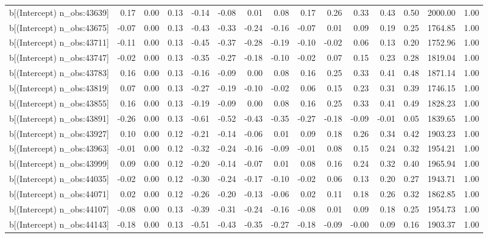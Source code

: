 \begin{table}[ht]
\begin{tabular}{rrrrrrrrrrrrrrr}
  b[(Intercept) n\_obs:43639] & 0.17 & 0.00 & 0.13 & -0.14 & -0.08 & 0.01 & 0.08 & 0.17 & 0.26 & 0.33 & 0.43 & 0.50 & 2000.00 & 1.00 \\ 
  b[(Intercept) n\_obs:43675] & -0.07 & 0.00 & 0.13 & -0.43 & -0.33 & -0.24 & -0.16 & -0.07 & 0.01 & 0.09 & 0.19 & 0.25 & 1764.85 & 1.00 \\ 
  b[(Intercept) n\_obs:43711] & -0.11 & 0.00 & 0.13 & -0.45 & -0.37 & -0.28 & -0.19 & -0.10 & -0.02 & 0.06 & 0.13 & 0.20 & 1752.96 & 1.00 \\ 
  b[(Intercept) n\_obs:43747] & -0.02 & 0.00 & 0.13 & -0.35 & -0.27 & -0.18 & -0.10 & -0.02 & 0.07 & 0.15 & 0.23 & 0.28 & 1819.04 & 1.00 \\ 
  b[(Intercept) n\_obs:43783] & 0.16 & 0.00 & 0.13 & -0.16 & -0.09 & 0.00 & 0.08 & 0.16 & 0.25 & 0.33 & 0.41 & 0.48 & 1871.14 & 1.00 \\ 
  b[(Intercept) n\_obs:43819] & 0.07 & 0.00 & 0.13 & -0.27 & -0.19 & -0.10 & -0.02 & 0.06 & 0.15 & 0.23 & 0.31 & 0.39 & 1746.15 & 1.00 \\ 
  b[(Intercept) n\_obs:43855] & 0.16 & 0.00 & 0.13 & -0.19 & -0.09 & 0.00 & 0.08 & 0.16 & 0.25 & 0.33 & 0.41 & 0.49 & 1828.23 & 1.00 \\ 
  b[(Intercept) n\_obs:43891] & -0.26 & 0.00 & 0.13 & -0.61 & -0.52 & -0.43 & -0.35 & -0.27 & -0.18 & -0.09 & -0.01 & 0.05 & 1839.65 & 1.00 \\ 
  b[(Intercept) n\_obs:43927] & 0.10 & 0.00 & 0.12 & -0.21 & -0.14 & -0.06 & 0.01 & 0.09 & 0.18 & 0.26 & 0.34 & 0.42 & 1903.23 & 1.00 \\ 
  b[(Intercept) n\_obs:43963] & -0.01 & 0.00 & 0.12 & -0.32 & -0.24 & -0.16 & -0.09 & -0.01 & 0.08 & 0.15 & 0.24 & 0.32 & 1954.21 & 1.00 \\ 
  b[(Intercept) n\_obs:43999] & 0.09 & 0.00 & 0.12 & -0.20 & -0.14 & -0.07 & 0.01 & 0.08 & 0.16 & 0.24 & 0.32 & 0.40 & 1965.94 & 1.00 \\ 
  b[(Intercept) n\_obs:44035] & -0.02 & 0.00 & 0.12 & -0.30 & -0.24 & -0.17 & -0.10 & -0.02 & 0.06 & 0.13 & 0.20 & 0.27 & 1943.71 & 1.00 \\ 
  b[(Intercept) n\_obs:44071] & 0.02 & 0.00 & 0.12 & -0.26 & -0.20 & -0.13 & -0.06 & 0.02 & 0.11 & 0.18 & 0.26 & 0.32 & 1862.85 & 1.00 \\ 
  b[(Intercept) n\_obs:44107] & -0.08 & 0.00 & 0.13 & -0.39 & -0.31 & -0.24 & -0.16 & -0.08 & 0.01 & 0.09 & 0.18 & 0.25 & 1954.73 & 1.00 \\ 
  b[(Intercept) n\_obs:44143] & -0.18 & 0.00 & 0.13 & -0.51 & -0.43 & -0.35 & -0.27 & -0.18 & -0.09 & -0.00 & 0.09 & 0.16 & 1903.37 & 1.00 \\ 

\end{tabular}
\end{table}
